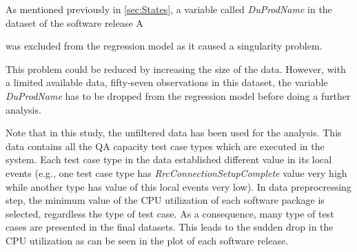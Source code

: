 As mentioned previously in \ref{sec:States}, a variable called \emph{DuProdName}
in the dataset of the software release A%
\begin{comment}
, which is an exact linear combination of the other variables,
\end{comment}
{} was excluded from the regression model as it caused a singularity
problem. %
\begin{comment}
The singularity often happens when the size of data is small. 
\end{comment}
This problem could be reduced by increasing the size of the data.
However, with a limited available data, fifty-seven observations in
this dataset, the variable \emph{DuProdName} has to be dropped from
the regression model before doing a further analysis. %
\begin{comment}
Fifty-seven observations in this dataset were used to train the Markov
switching model. The dataset (or the number of test cases in the software
release) is rather small, which increases a probability of singularity
occurrence. Therefore, unless there is more data, it is better to
drop the variable from the regression model before doing a further
analysis.
\end{comment}

Note that in this study, the unfiltered data has been used for the
analysis. This data contains all the QA capacity test case types which
are executed in the system. Each test case type in the data established
different value in its local events (e.g., one test case type has
\emph{RrcConnectionSetupComplete} value very high while another type
has value of this local events very low). In data preprocressing step,
the minimum value of the CPU utilization of each software package
is selected, regardless the type of test case. As a consequence, many
type of test cases are presented in the final datasets. This leads
to the sudden drop in the CPU utilization as can be seen in the plot
of each software release.

